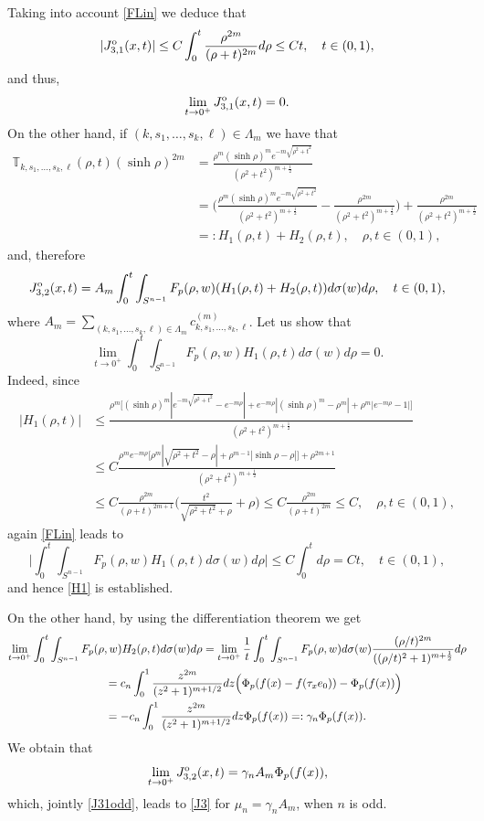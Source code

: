 \documentclass[a4paper,10pt, reqno]{amsart}
\theoremstyle{definition}
\theoremstyle{remark}
\numberwithin{equation}{section}
\begin{document}
{Taking into account \eqref{FLin} we deduce that
$$
|J_{3,1}^{\rm o}(x,t)|\leq C\int_0^t\frac{\rho ^{2m}}{(\rho +t)^{2m}}d\rho\leq Ct,\quad t\in (0,1),
$$
and thus,
\begin{equation}\label{J31odd}
\lim_{t\rightarrow 0^+}J_{3,1}^{\rm o}(x,t)=0.
\end{equation}
On the other hand, if $(k,s_1,\ldots, s_k,\ell)\in \Lambda _m$ we have that 
\begin{align*}
    \mathbb T_{k,s_1,\ldots, s_k,\ell}(\rho,t)(\sinh \rho)^{2m}&=\frac{\rho ^m(\sinh \rho)^me^{-m\sqrt{\rho ^2+t^2}}}{(\rho ^2+t^2)^{m+\frac{1}{2}}}\\
    &=\Big(\frac{\rho ^m(\sinh \rho)^me^{-m\sqrt{\rho ^2+t^2}}}{(\rho ^2+t^2)^{m+\frac{1}{2}}}-\frac{\rho ^{2m}}{(\rho ^2+t^2)^{m+\frac{1}{2}}}\Big)+\frac{\rho ^{2m}}{(\rho ^2+t^2)^{m+\frac{1}{2}}}\\
    &=:H_1(\rho, t)+H_2(\rho ,t),\quad \rho,t\in (0,1),
\end{align*}
and, therefore
$$
J_{3,2}^{\rm o}(x,t)=A_m\int_0^t\int_{S^{n-1}}F_p(\rho ,w)(H_1(\rho ,t)+H_2(\rho, t))d\sigma (w)d\rho,\quad t\in (0,1),
$$
where $A_m=\sum_{(k,s_1,\ldots,s_k,\ell)\in \Lambda_m}c_{k,s_1,\ldots, s_k,\ell}^{(m)}$.
Let us show that 
\begin{equation}\label{H1}
\lim_{t\rightarrow 0^+}\int_0^t\int_{S^{n-1}}F_p(\rho, w)H_1(\rho , t)d\sigma(w)d\rho=0.
\end{equation}
Indeed, since
\begin{align*}
    |H_1(\rho ,t)|&\leq \frac{\rho ^m\big[(\sinh \rho )^m|e^{-m\sqrt{\rho ^2+t^2}}-e^{-m\rho}|+e^{-m\rho }|(\sinh \rho )^m-\rho ^m|+\rho ^m|e^{-m\rho}-1|\big]}{(\rho ^2+t^2)^{m+\frac{1}{2}}}\\
    &\leq C\frac{\rho ^me^{-m\rho }\big[\rho ^m|\sqrt{\rho ^2+t^2}-\rho|+\rho^{m-1}|\sinh \rho -\rho |\big]+\rho^{2m+1}}{(\rho ^2+t^2)^{m+\frac{1}{2}}}\\
    &\leq C\frac{\rho^{2m}}{(\rho +t)^{2m+1}}\Big(\frac{t^2}{\sqrt{\rho ^2+t^2}+\rho}+\rho \Big)\leq C\frac{\rho^{2m}}{(\rho +t)^{2m}}\leq C,\quad \rho,t\in (0,1),
\end{align*}
again \eqref{FLin} leads to 
$$
\Big|\int_0^t\int_{S^{n-1}}F_p(\rho ,w)H_1(\rho ,t)d\sigma(w)d\rho\Big|\leq C\int_0^td\rho=Ct,\quad t\in (0,1),
$$
and hence \eqref{H1} is established.

On the other hand, by using the differentiation theorem we get
\begin{align*}
\lim_{t\rightarrow 0^+}\int_0^t\int_{S^{n-1}}F_p(\rho ,w)H_2(\rho ,t)d\sigma (w)d\rho&=\lim_{t\rightarrow 0^+}\frac{1}{t}\int_0^t\int_{S^{n-1}}F_p(\rho ,w)d\sigma (w)\frac{(\rho/t)^{2m}}{((\rho /t)^2+1)^{m+\frac{1}{2}}}d\rho\\
&\hspace{-3cm}=c_n\int_0^1\frac{z^{2m}}{(z^2+1)^{m+1/2}}dz\Big(\Phi_p(f(x)-f(\tau_xe_0))-\Phi_p(f(x))\Big)\\
&\hspace{-3cm}=-c_n\int_0^1\frac{z^{2m}}{(z^2+1)^{m+1/2}}dz\Phi _p(f(x))=:\gamma_n\Phi_p(f(x)).
\end{align*}
We obtain that
$$
\lim_{t\rightarrow 0^+}J_{3,2}^{\rm o}(x,t)=\gamma_nA_m\Phi _p(f(x)),
$$
which, jointly \eqref{J31odd}, leads to \eqref{J3} for $\mu_n =\gamma_nA_m$, when $n$ is odd.

}
\end{document}
